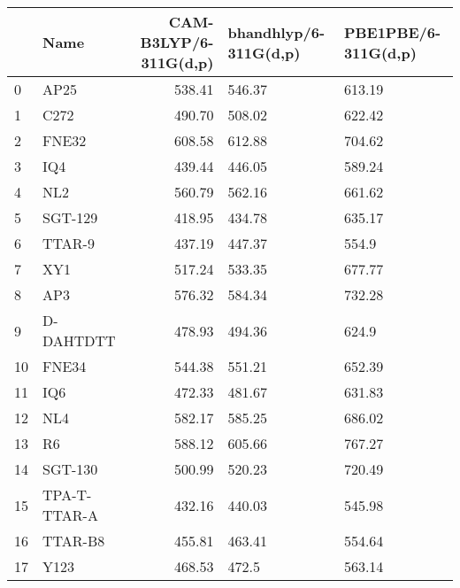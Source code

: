 \begin{tabular}{llrll}
\toprule
{} &            Name &  CAM-B3LYP/6-311G(d,p) & bhandhlyp/6-311G(d,p) & PBE1PBE/6-311G(d,p) \\
\midrule
0  &            AP25 &                 538.41 &                546.37 &              613.19 \\
1  &            C272 &                 490.70 &                508.02 &              622.42 \\
2  &           FNE32 &                 608.58 &                612.88 &              704.62 \\
3  &             IQ4 &                 439.44 &                446.05 &              589.24 \\
4  &             NL2 &                 560.79 &                562.16 &              661.62 \\
5  &         SGT-129 &                 418.95 &                434.78 &              635.17 \\
6  &          TTAR-9 &                 437.19 &                447.37 &               554.9 \\
7  &             XY1 &                 517.24 &                533.35 &              677.77 \\
8  &             AP3 &                 576.32 &                584.34 &              732.28 \\
9  &       D-DAHTDTT &                 478.93 &                494.36 &               624.9 \\
10 &           FNE34 &                 544.38 &                551.21 &              652.39 \\
11 &             IQ6 &                 472.33 &                481.67 &              631.83 \\
12 &             NL4 &                 582.17 &                585.25 &              686.02 \\
13 &              R6 &                 588.12 &                605.66 &              767.27 \\
14 &         SGT-130 &                 500.99 &                520.23 &              720.49 \\
15 &    TPA-T-TTAR-A &                 432.16 &                440.03 &              545.98 \\
16 &         TTAR-B8 &                 455.81 &                463.41 &              554.64 \\
17 &            Y123 &                 468.53 &                 472.5 &              563.14 \\

\end{tabular}
